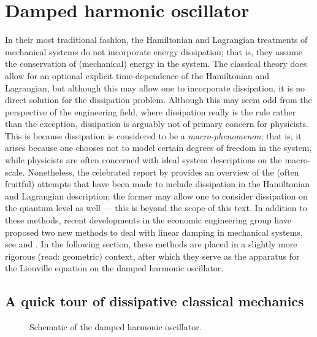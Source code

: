 \FloatBarrier
\clearpage
\section{Damped harmonic oscillator}
In their most traditional fashion, the Hamiltonian and Lagrangian treatments of mechanical systems do not incorporate energy dissipation; that is, they assume the conservation of (mechanical) energy in the system. The classical theory does allow for an optional explicit time-dependence of the Hamiltonian and Lagrangian, but although this may allow one to incorporate dissipation, it is no direct solution for the dissipation problem. Although this may seem odd from the perspective of the engineering field, where dissipation really is the rule rather than the exception, dissipation is arguably not of primary concern for physicists. This is because dissipation is considered to be a \emph{macro-phenomenon}; that is, it arises because one chooses not to model certain degrees of freedom in the system, while physicists are often concerned with ideal system descriptions on the macro-scale. Nonetheless, the celebrated report by \citet{Dekker1981} provides an overview of the (often fruitful) attempts that have been made to include dissipation in the Hamiltonian and Lagrangian description; the former may allow one to consider dissipation on the quantum level as well --- this is beyond the scope of this text. In addition to these methods, recent developments in the economic engineering group have proposed two new methods to deal with linear damping in mechanical systems, see \citet{Hutters2020a} and \citet{Mendel2021}. In the following section, these methods are placed in a slightly more rigorous (read: geometric) context, after which they serve as the apparatus for the Liouville equation on the damped harmonic oscillator.

\subsection{A quick tour of dissipative classical mechanics}
\begin{figure}[ht]
    \centering
    
    \caption{Schematic of the damped harmonic oscillator.}
    \label{fig:dho}
\end{figure}

